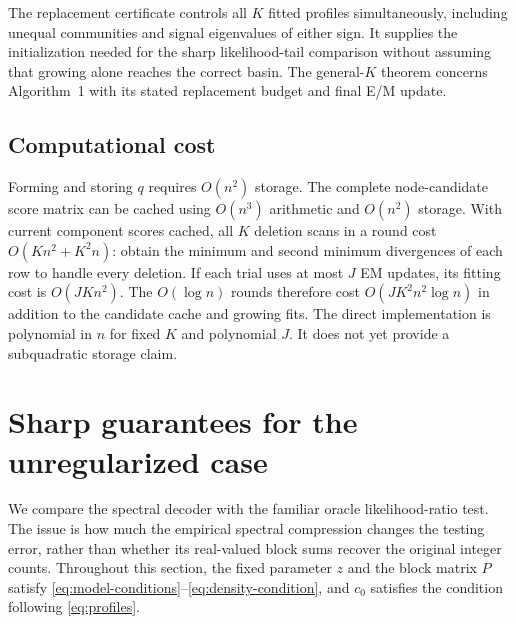 \documentclass[11pt]{article}
\theoremstyle{definition}
\theoremstyle{remark}
\numberwithin{equation}{section}
\begin{document}
The replacement certificate controls all $K$ fitted profiles simultaneously, including unequal communities and signal eigenvalues of either sign. It supplies the initialization needed for the sharp likelihood-tail comparison without assuming that growing alone reaches the correct basin. The general-$K$ theorem concerns Algorithm~1 with its stated replacement budget and final E/M update.

\subsection{Computational cost}
Forming and storing $q$ requires $O(n^2)$ storage. The complete node-candidate score matrix can be cached using $O(n^3)$ arithmetic and $O(n^2)$ storage. With current component scores cached, all $K$ deletion scans in a round cost $O(Kn^2+K^2n)$: obtain the minimum and second minimum divergences of each row to handle every deletion. If each trial uses at most $J$ EM updates, its fitting cost is $O(JKn^2)$. The $O(\log n)$ rounds therefore cost $O(JK^2n^2\log n)$ in addition to the candidate cache and growing fits. The direct implementation is polynomial in $n$ for fixed $K$ and polynomial $J$. It does not yet provide a subquadratic storage claim.


\section{Sharp guarantees for the unregularized case}
\label{sec:main-results}

We compare the spectral decoder with the familiar oracle likelihood-ratio test. The issue is how much the empirical spectral compression changes the testing error, rather than whether its real-valued block sums recover the original integer counts. Throughout this section, the fixed parameter $z$ and the block matrix $P$ satisfy \eqref{eq:model-conditions}--\eqref{eq:density-condition}, and $c_0$ satisfies the condition following \eqref{eq:profiles}.
\end{document}
